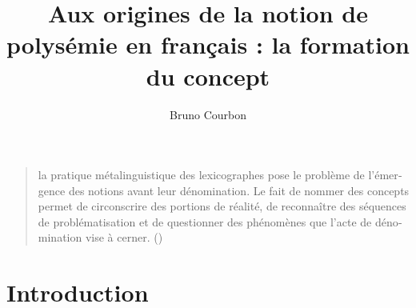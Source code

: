 \documentclass[output=paper]{langsci/langscibook}
\author{Bruno Courbon\affiliation{Université Laval}\orcid{}}
\title{Aux origines de la notion de polysémie en français : la formation du concept}
\begin{document}
\begin{otherlanguage}{french}
\maketitle

\begin{quote}\relax
[…] la pratique métalinguistique des lexicographes pose le problème de l’émergence des notions avant leur dénomination. Le fait de nommer des concepts permet de circonscrire des portions de réalité, de reconnaître des séquences de problématisation et de questionner des phénomènes que l’acte de dénomination vise à cerner. (\citealt[23]{bisconti_sens_2016})
\end{quote}
     

\section{Introduction}

\end{otherlanguage}
\end{document}
